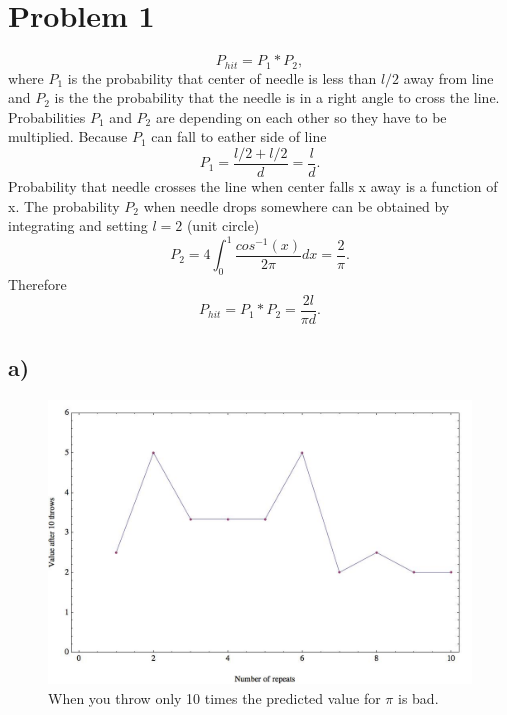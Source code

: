 \documentclass[12pt]{article}
\numberwithin{equation}{section}
\numberwithin{table}{section}
\begin{document}
\maketitle

\newpage{}


\section*{Problem 1}

\begin{equation*}
P_{hit}=P_1*P_2,
\end{equation*}
where $P_1$ is the probability that center of needle is less than $l/2$ away from line and $P_2$ is the the probability that the needle is in a right angle to cross the line. Probabilities $P_1$ and $P_2$ are depending on each other so they have to be multiplied. Because $P_1$ can fall to eather side of line 
\begin{equation*}
P_1=\frac{l/2+l/2}{d}=\frac{l}{d}.
\end{equation*}
Probability that needle crosses the line when center falls x away is a function of x. The probability $P_2$ when needle drops somewhere can be obtained by integrating and setting $l=2$ (unit circle)
\begin{equation*}
P_2=4\int_{0}^{1}\frac{cos^{-1}(x)}{2\pi}dx=\frac{2}{\pi}.
\end{equation*}
Therefore
\begin{equation*}
P_{hit}=P_1*P_2=\frac{2l}{\pi d}.
\end{equation*}
\subsection*{a)}
\begin{figure}[H]
	\caption{When you throw only 10 times the predicted value for $\pi$ is bad.}
	\includegraphics[width=15cm]{mc_p01_a.jpg}
\end{figure}
\end{document}
